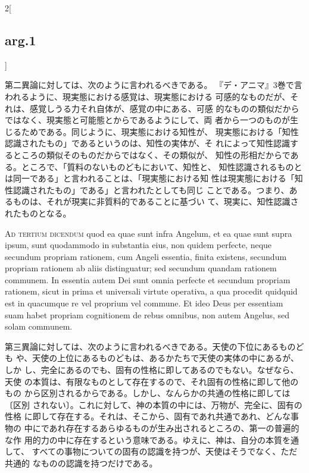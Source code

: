 \documentclass[paper=a4paper,fontsize=10pt,jafontsize=9pt,titlepage]{jlreq}
\begin{document}
\begin{paracol}{2}[\subsection{arg.1}]
\switchcolumn

第二異論に対しては、次のように言われるべきである。
『デ・アニマ』3巻で言われるように、現実態における感覚は、現実態における
 可感的なものだが、それは、感覚しうる力それ自体が、感覚の中にある、可感
 的なものの類似だからではなく、現実態と可能態とからであるようにして、両
 者から一つのものが生じるためである。同じように、現実態における知性が、
 現実態における「知性認識されたもの」であるというのは、知性の実体が、そ
 れによって知性認識するところの類似そのものだからではなく、その類似が、
 知性の形相だからである。ところで、「質料のないものどもにおいて、知性と、
 知性認識されるものとは同一である」と言われることは、「現実態における知
 性は現実態における「知性認識されたもの」である」と言われたとしても同じ
 ことである。つまり、あるものは、それが現実に非質料的であることに基づい
 て、現実に、知性認識されたものとなる。

\switchcolumn*[\subsection{ad.3}]

{\scshape Ad tertium dicendum} quod ea quae sunt infra Angelum, et ea
quae sunt supra ipsum, sunt quodammodo in substantia eius, non quidem
perfecte, neque secundum propriam rationem, cum Angeli essentia, finita
existens, secundum propriam rationem ab aliis distinguatur; sed secundum
quandam rationem communem. In essentia autem Dei sunt omnia perfecte et
secundum propriam rationem, sicut in prima et universali virtute
operativa, a qua procedit quidquid est in quacumque re vel proprium vel
commune. Et ideo Deus per essentiam suam habet propriam cognitionem de
rebus omnibus, non autem Angelus, sed solam communem.

\switchcolumn

第三異論に対しては、次のように言われるべきである。天使の下位にあるものども
や、天使の上位にあるものどもは、あるかたちで天使の実体の中にあるが、しか
 し、完全にあるのでも、固有の性格に即してあるのでもない。なぜなら、天使
 の本質は、有限なものとして存在するので、それ固有の性格に即して他のもの
 から区別されるからである。しかし、なんらかの共通の性格に即しては〔区別
 されない〕。これに対して、神の本質の中には、万物が、完全に、固有の性格
 に即して存在する。それは、そこから、固有であれ共通であれ、どんな事物の
 中にであれ存在するあらゆるものが生み出されるところの、第一の普遍的な作
 用的力の中に存在するという意味である。ゆえに、神は、自分の本質を通して、
 すべての事物についての固有の認識を持つが、天使はそうでなく、ただ共通的
 なものの認識を持つだけである。

\end{paracol}
\newpage
{}
{}
\setcounter{section}{2}
\setcounter{subsection}{0}
\end{document}
